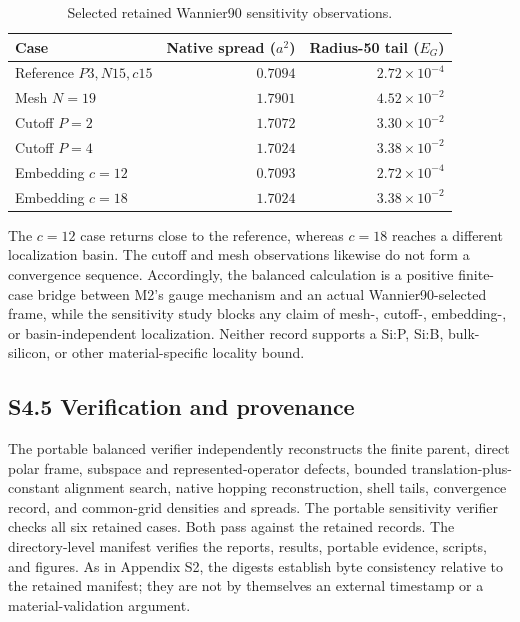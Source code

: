 \begin{table}[t]
\centering
\small
\caption{Selected retained Wannier90 sensitivity observations.}
\label{tab:supp-s4-sensitivity}
\begin{tabular}{@{}lrr@{}}
\toprule
Case & Native spread ($a^2$) & Radius-50 tail ($E_G$)\\
\midrule
Reference $P3,N15,c15$ & $0.7094$ & $2.72\times10^{-4}$\\
Mesh $N=19$ & $1.7901$ & $4.52\times10^{-2}$\\
Cutoff $P=2$ & $1.7072$ & $3.30\times10^{-2}$\\
Cutoff $P=4$ & $1.7024$ & $3.38\times10^{-2}$\\
Embedding $c=12$ & $0.7093$ & $2.72\times10^{-4}$\\
Embedding $c=18$ & $1.7024$ & $3.38\times10^{-2}$\\
\bottomrule
\end{tabular}
\end{table}

The $c=12$ case returns close to the reference, whereas $c=18$ reaches a
different localization basin. The cutoff and mesh observations likewise do not
form a convergence sequence. Accordingly, the balanced calculation is a
positive finite-case bridge between M2's gauge mechanism and an actual
Wannier90-selected frame, while the sensitivity study blocks any claim of
mesh-, cutoff-, embedding-, or basin-independent localization. Neither record
supports a Si:P, Si:B, bulk-silicon, or other material-specific locality bound.

\subsection*{S4.5 Verification and provenance}

The portable balanced verifier independently reconstructs the finite parent,
direct polar frame, subspace and represented-operator defects, bounded
translation-plus-constant alignment search, native hopping reconstruction,
shell tails, convergence record, and common-grid densities and spreads. The
portable sensitivity verifier checks all six retained cases. Both pass against
the retained records. The directory-level  manifest verifies
the reports, results, portable evidence, scripts, and figures. As in Appendix
S2, the digests establish byte consistency relative to the retained manifest;
they are not by themselves an external timestamp or a material-validation
argument.
